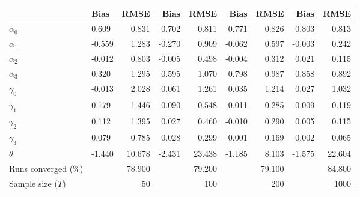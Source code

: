 
\begin{tabular}[t]{llrrrrrrr}
\toprule
  & Bias & RMSE & Bias & RMSE & Bias & RMSE & Bias & RMSE\\
\midrule
$\alpha_{0}$ & 0.609 & 0.831 & 0.702 & 0.811 & 0.771 & 0.826 & 0.803 & 0.813\\
$\alpha_{1}$ & -0.559 & 1.283 & -0.270 & 0.909 & -0.062 & 0.597 & -0.003 & 0.242\\
$\alpha_{2}$ & -0.012 & 0.803 & -0.005 & 0.498 & -0.004 & 0.312 & 0.021 & 0.115\\
$\alpha_{3}$ & 0.320 & 1.295 & 0.595 & 1.070 & 0.798 & 0.987 & 0.858 & 0.892\\
$\gamma_{0}$ & -0.013 & 2.028 & 0.061 & 1.261 & 0.035 & 1.214 & 0.027 & 1.032\\
$\gamma_{1}$ & 0.179 & 1.446 & 0.090 & 0.548 & 0.011 & 0.285 & 0.009 & 0.119\\
$\gamma_{2}$ & 0.112 & 1.395 & 0.027 & 0.460 & -0.010 & 0.290 & 0.005 & 0.115\\
$\gamma_{3}$ & 0.079 & 0.785 & 0.028 & 0.299 & 0.001 & 0.169 & 0.002 & 0.065\\
$\theta$ & -1.440 & 10.678 & -2.431 & 23.438 & -1.185 & 8.103 & -1.575 & 22.604\\
Runs converged (\%) &  & 78.900 &  & 79.200 &  & 79.100 &  & 84.800\\
Sample size ($T$) &  & 50 &  & 100 &  & 200 &  & 1000\\
\bottomrule
\end{tabular}
